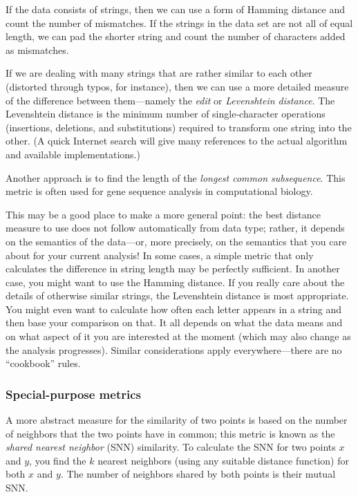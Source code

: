  
If the data consists of strings, then 
we can use a form of Hamming distance
and count the number of mismatches. If the strings in the data set are
not all of equal length, we can pad the shorter string and count the
number of characters added as mismatches.

If we are dealing with many strings that are rather similar to each
other (distorted through typos, for instance), then we can use a more
detailed measure of the difference between them---namely the
\emph{edit}  or \emph{Levenshtein distance}.  The Levenshtein distance
is the minimum number of single-character operations (insertions,
deletions, and substitutions) required to transform one string into
the other. (A quick Internet search will give many references to the
actual algorithm and available implementations.)

Another approach is to find the length of the \emph{longest common
  subsequence}.  This metric is often used for gene sequence analysis
in computational biology.

This may be a good place to make a more general point: the best
distance measure to use does not follow automatically from data type;
rather, it depends on the semantics of the data---or, more precisely,
on the semantics that you care about for your current analysis! In
some cases, a simple metric that only calculates the difference in
string length may be perfectly sufficient. In another case, you might
want to use the Hamming distance. If you really care about the details
of otherwise similar strings, the Levenshtein distance is most
appropriate.  You might even want to calculate how often each letter
appears in a string and then base your comparison on
that. It all depends on what the data means and on what
aspect of it you are interested at the moment (which may also change as the
analysis progresses). Similar considerations apply everywhere---there are no
``cookbook'' rules.
      
\subsubsection{Special-purpose metrics}

A more abstract measure for the similarity of two points is based on
the number of neighbors that the two points have in common; this
metric is known as the \emph{shared nearest neighbor} (SNN)
similarity.  To calculate the SNN for two points $x$ and $y$, you find
the $k$ nearest neighbors (using any suitable distance function) for
both $x$ and $y$. The number of neighbors shared by both points is
their mutual SNN.

